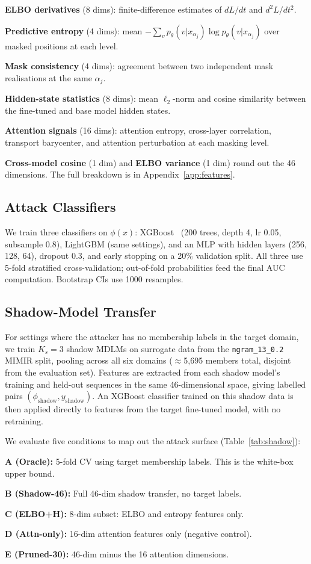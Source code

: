 \textbf{ELBO derivatives} (8 dims): finite-difference estimates of $dL/dt$ and $d^2L/dt^2$.

\textbf{Predictive entropy} (4 dims): mean $-\sum_v p_\theta(v|x_{\alpha_j})\log p_\theta(v|x_{\alpha_j})$
over masked positions at each level.

\textbf{Mask consistency} (4 dims): agreement between two independent mask realisations at the same $\alpha_j$.

\textbf{Hidden-state statistics} (8 dims): mean $\ell_2$-norm and cosine similarity between the
fine-tuned and base model hidden states.

\textbf{Attention signals} (16 dims): attention entropy, cross-layer correlation,
transport barycenter, and attention perturbation at each masking level.

\textbf{Cross-model cosine} (1 dim) and \textbf{ELBO variance} (1 dim) round out the 46 dimensions.
The full breakdown is in Appendix~\ref{app:features}.

\subsection{Attack Classifiers}
\label{sec:classifiers}

We train three classifiers on $\phi(x)$:
XGBoost~\citep{chen2016xgboost} (200 trees, depth 4, lr 0.05, subsample 0.8),
LightGBM (same settings), and an MLP with hidden layers (256, 128, 64),
dropout 0.3, and early stopping on a 20\% validation split.
All three use 5-fold stratified cross-validation; out-of-fold probabilities
feed the final AUC computation. Bootstrap CIs use 1000 resamples.

\subsection{Shadow-Model Transfer}
\label{sec:shadow}

For settings where the attacker has no membership labels in the target domain,
we train $K_s=3$ shadow MDLMs on surrogate data from the \texttt{ngram\_13\_0.2}
MIMIR split, pooling across all six domains ($\approx$5,695 members total,
disjoint from the evaluation set). Features are extracted from each shadow
model's training and held-out sequences in the same 46-dimensional space,
giving labelled pairs $(\phi_{\mathrm{shadow}}, y_{\mathrm{shadow}})$.
An XGBoost classifier trained on this shadow data is then applied directly
to features from the target fine-tuned model, with no retraining.

We evaluate five conditions to map out the attack surface (Table~\ref{tab:shadow}):

\textbf{A (Oracle):} 5-fold CV using target membership labels. This is the white-box upper bound.

\textbf{B (Shadow-46):} Full 46-dim shadow transfer, no target labels.

\textbf{C (ELBO+H):} 8-dim subset: ELBO and entropy features only.

\textbf{D (Attn-only):} 16-dim attention features only (negative control).

\textbf{E (Pruned-30):} 46-dim minus the 16 attention dimensions.
